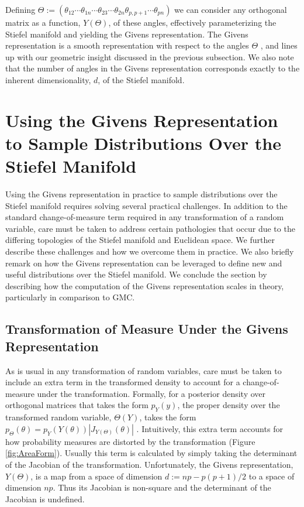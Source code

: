 \documentclass[ba]{imsart}
\numberwithin{equation}{section}
\theoremstyle{plain}
\begin{document}
\noindent Defining $\Theta := (\theta_{12} \cdots \theta_{1n} \cdots \theta_{23} \cdots \theta_{2n} \theta_{p,p+1} \cdots \theta_{pn})$ we can consider any orthogonal matrix as a function, $Y(\Theta)$, of these angles, effectively parameterizing the Stiefel manifold and yielding the Givens representation. The Givens representation is a smooth representation with respect to the angles $\Theta$ \citep{shepard2015representation}, and lines up with our geometric insight discussed in the previous subsection. We also note that the number of angles in the Givens representation corresponds exactly to the inherent dimensionality, $d$, of the Stiefel manifold.

\section{Using the Givens Representation to Sample Distributions Over the Stiefel Manifold} \label{implementation}
Using the Givens representation in practice to sample distributions over the Stiefel manifold requires solving several practical challenges. In addition to the standard change-of-measure term required in any transformation of a random variable, care must be taken to address certain pathologies that occur due to the differing topologies of the Stiefel manifold and Euclidean space. We further describe these challenges and how we overcome them in practice. We also briefly remark on how the Givens representation can be leveraged to define new and useful distributions over the Stiefel manifold. We conclude the section by describing how the computation of the Givens representation scales in theory, particularly in comparison to GMC.

\subsection{Transformation of Measure Under the Givens Representation}\label{measureGivens}
As is usual in any transformation of random variables, care must be taken to include an extra term in the transformed density to account for a change-of-measure under the transformation. Formally, for a posterior density over orthogonal matrices that takes the form $p_Y(y)$, the proper density over the transformed random variable, $\Theta(Y)$, takes the form $p_\Theta(\theta) = p_{Y}(Y(\theta)) |J_{Y(\Theta)}(\theta)|$ \citep{keener2011theoretical}. Intuitively, this extra term accounts for how probability measures are distorted by the transformation (Figure \ref{fig:AreaForm}). Usually this term is calculated by simply taking the determinant of the Jacobian of the transformation. Unfortunately, the Givens representation, $Y(\Theta)$, is a map from a space of dimension $d := np - p(p+1)/2$ to a space of dimension $np$. Thus its Jacobian is non-square and the determinant of the Jacobian is undefined.
\end{document}
